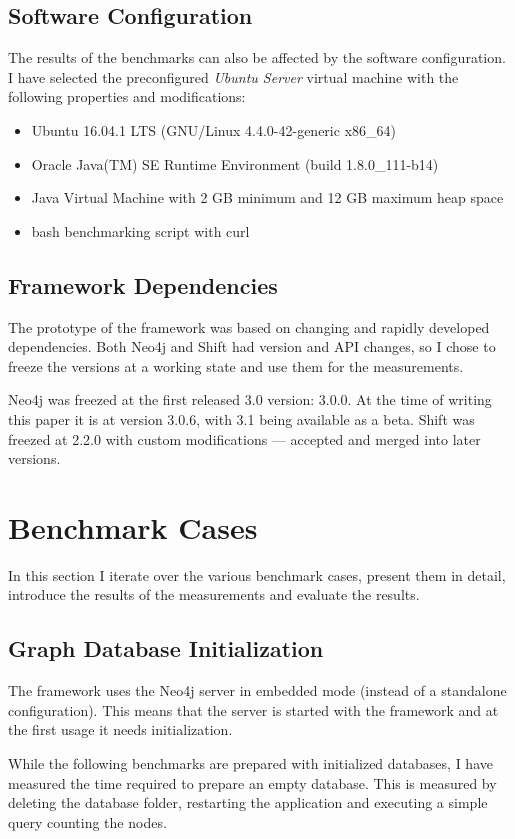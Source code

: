 \subsection{Software Configuration}
The results of the benchmarks can also be affected by the software configuration. I have selected the preconfigured \emph{Ubuntu Server} virtual machine with the following properties and modifications:

\begin{itemize}[topsep=0pt]
  \item Ubuntu 16.04.1 LTS (GNU/Linux 4.4.0-42-generic x86\_64)
  \item Oracle Java(TM) SE Runtime Environment (build 1.8.0\_111-b14)
  \item Java Virtual Machine with 2 GB minimum and 12 GB maximum heap space
  \item bash benchmarking script with curl
\end{itemize}

\subsection{Framework Dependencies}
The prototype of the framework was based on changing and rapidly developed dependencies. Both Neo4j and Shift had version and API changes, so I chose to freeze the versions at a working state and use them for the measurements.

Neo4j was freezed at the first released 3.0 version: 3.0.0. At the time of writing this paper it is at version 3.0.6, with 3.1 being available as a beta. Shift was freezed at 2.2.0 with custom modifications --- accepted and merged into later versions.


\section{Benchmark Cases}
In this section I iterate over the various benchmark cases, present them in detail, introduce the results of the measurements and evaluate the results.

\subsection{Graph Database Initialization}
The framework uses the Neo4j server in embedded mode (instead of a standalone configuration). This means that the server is started with the framework and at the first usage it needs initialization.

While the following benchmarks are prepared with initialized databases, I have measured the time required to prepare an empty database. This is measured by deleting the database folder, restarting the application and executing a simple query counting the nodes.

